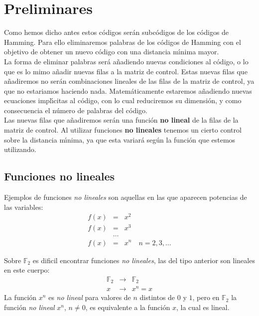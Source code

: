 %
%

\section{Preliminares}

Como hemos dicho antes estos c\'odigos ser\'an subc\'odigos de los c\'odigos
de Hamming. Para ello eliminaremos palabras de los c\'odigos de Hamming con el
objetivo de obtener un nuevo c\'odigo con una distancia m\'{\i}nima mayor.\\

La forma de eliminar palabras ser\'a a\~nadiendo nuevas condiciones al
c\'odigo, o lo que es lo mimo a\~nadir nuevas filas a la matriz de control.
Estas nuevas filas que a\~nadiremos no ser\'an combinaciones lineales de las
filas de la matriz de control, ya que no estariamos haciendo nada.
Matem\'aticamente 
estaremos a\~nadiendo nuevas ecuaciones impl\'{\i}citas al c\'odigo, con lo
cual reduciremos su dimensi\'on, y como consecuencia el n\'umero de palabras
del c\'odigo.\\

Las nuevas filas que a\~nadiremos ser\'an una funci\'on \textbf{no lineal} de
la filas de la matriz de control. Al utilizar funciones \textbf{no lineales}
tenemos un
cierto control sobre la distancia m\'{\i}nima, ya que esta variar\'a seg\'un
la funci\'on que estemos utilizando.
%
\newpage
%
\subsection{Funciones no lineales}

Ejemplos de funciones \emph{no lineales} son aquellas en las que aparecen
potencias de las variables:
\begin{eqnarray*}
f(x)&=&x^2\\
f(x)&=&x^3\\
&\dots& \\
f(x)&=&x^n\quad n=2,3,\dots
\end{eqnarray*}

Sobre $\mathbb{F}_2$ es dificil encontrar funciones \emph{no lineales}, las
del tipo anterior son lineales en este cuerpo:
\begin{eqnarray*}
\mathbb{F}_2&\longrightarrow&\mathbb{F}_2\\
x&\longrightarrow&x^n = x
\end{eqnarray*}
La funci\'on $x^n$ es \emph{no lineal} para valores de $n$ distintos de $0$ y
$1$, pero en $\mathbb{F}_2$ la funci\'on \emph{no lineal} $x^n$, $n\neq 0$, es
equivalente a la funci\'on $x$, la cual es lineal.\\

